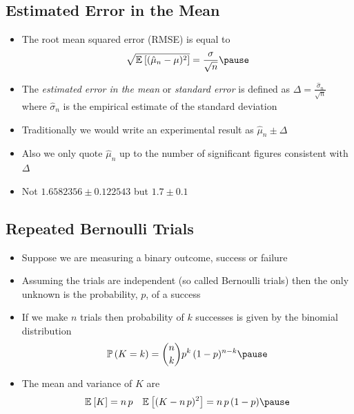 \begin{slide}
\section[-2]{Estimated Error in the Mean}

\begin{PauseHighLight}
  \begin{itemize}
  \item The root mean squared error (RMSE) is equal to 
    \begin{align*}
      \sqrt{\av{ (\hat{\mu}_n-\mu)^2 }} = \frac{\sigma}{\sqrt{n}}\pause
    \end{align*}
  \item The \emph{estimated error in the mean} or \emph{standard
      error} is defined as $\Delta = \frac{\hat{\sigma}_n}{\sqrt{n}}$
    where $\hat{\sigma}_n$ is the empirical estimate of the standard
    deviation\pause
  \item Traditionally we would write an experimental result as
    $\hat{\mu}_n \pm \Delta$\pause
  \item Also we only quote $\hat{\mu}_n$ up to the number of
    significant figures consistent with $\Delta$\pause
  \item Not $1.6582356 \pm 0.122543$ but $1.7 \pm 0.1$\pauseb
  \end{itemize}
\end{PauseHighLight}

\end{slide}


\begin{slide}
\section[-1]{Repeated Bernoulli Trials}

\begin{PauseHighLight}
  \begin{itemize}
  \item Suppose we are measuring a binary outcome, success or failure\pause
  \item Assuming the trials are independent (so called Bernoulli
    trials) then the only unknown is the probability, $p$, of a success\pause
  \item If we make $n$ trials then probability of $k$ successes is
    given by the binomial distribution
    \begin{align*}
      \Prob{K=k} = \binom{n}{k} p^k\,(1-p)^{n-k}\pause
    \end{align*}
  \item The mean and variance of $K$ are
    \begin{align*}
      \av{K} &= n\,p & \av{(K-n\,p)^2} = n\,p\,(1-p)\pause
    \end{align*}
  \end{itemize}
\end{PauseHighLight}

\end{slide}

